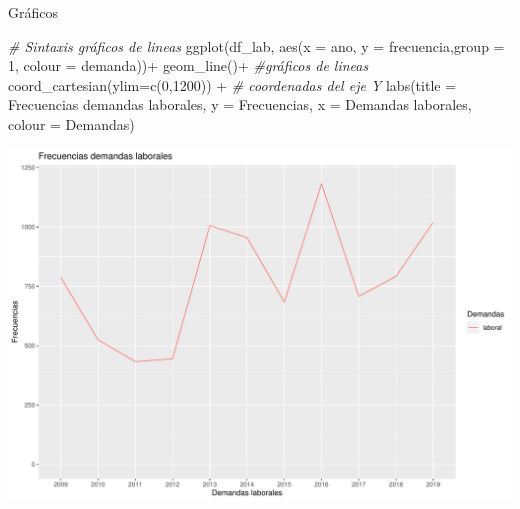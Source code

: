 \documentclass[
  8pt,
  ignorenonframetext,
]{beamer}
\newenvironment{Shaded}{\begin{snugshade}}{\end{snugshade}}
\newcommand{\AttributeTok}[1]{\textcolor[rgb]{0.77,0.63,0.00}{#1}}
\newcommand{\CommentTok}[1]{\textcolor[rgb]{0.56,0.35,0.01}{\textit{#1}}}
\newcommand{\DecValTok}[1]{\textcolor[rgb]{0.00,0.00,0.81}{#1}}
\newcommand{\FunctionTok}[1]{\textcolor[rgb]{0.00,0.00,0.00}{#1}}
\newcommand{\NormalTok}[1]{#1}
\newcommand{\SpecialCharTok}[1]{\textcolor[rgb]{0.00,0.00,0.00}{#1}}
\newcommand{\StringTok}[1]{\textcolor[rgb]{0.31,0.60,0.02}{#1}}
\begin{document}
\begin{frame}[fragile]{Gráficos}
\protect\hypertarget{gruxe1ficos-4}{}
\begin{Shaded}
\begin{Highlighting}[]
\CommentTok{\# Sintaxis gráficos de lineas}
 \FunctionTok{ggplot}\NormalTok{(df\_lab, }\FunctionTok{aes}\NormalTok{(}\AttributeTok{x =}\NormalTok{ ano, }\AttributeTok{y =}\NormalTok{ frecuencia,}\AttributeTok{group =} \DecValTok{1}\NormalTok{, }\AttributeTok{colour =}\NormalTok{ demanda))}\SpecialCharTok{+}
   \FunctionTok{geom\_line}\NormalTok{()}\SpecialCharTok{+} \CommentTok{\#gráficos de lineas}
   \FunctionTok{coord\_cartesian}\NormalTok{(}\AttributeTok{ylim=}\FunctionTok{c}\NormalTok{(}\DecValTok{0}\NormalTok{,}\DecValTok{1200}\NormalTok{)) }\SpecialCharTok{+} \CommentTok{\# coordenadas del eje Y}
  \FunctionTok{labs}\NormalTok{(}\AttributeTok{title =} \StringTok{\textquotesingle{}Frecuencias demandas laborales\textquotesingle{}}\NormalTok{,  }
       \AttributeTok{y =} \StringTok{\textquotesingle{}Frecuencias\textquotesingle{}}\NormalTok{, }
       \AttributeTok{x =} \StringTok{\textquotesingle{}Demandas laborales\textquotesingle{}}\NormalTok{,}
       \AttributeTok{colour =} \StringTok{\textquotesingle{}Demandas\textquotesingle{}}\NormalTok{)}
\end{Highlighting}
\end{Shaded}

\begin{center}\includegraphics[width=0.7\linewidth]{ta_3_files/figure-beamer/unnamed-chunk-12-1} \end{center}
\end{frame}
\end{document}
